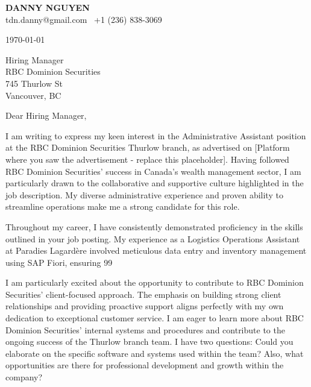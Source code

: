 \documentclass[letterpaper,11pt]{article}
\begin{document}
\textbf{DANNY NGUYEN} \\
tdn.danny@gmail.com \textbullet\ +1 (236) 838-3069 \\
\vspace{20pt}

\today \\
\vspace{20pt}

Hiring Manager \\
RBC Dominion Securities \\
745 Thurlow St \\
Vancouver, BC \\
\vspace{20pt}

Dear Hiring Manager, \\
\vspace{10pt}

I am writing to express my keen interest in the Administrative Assistant position at the RBC Dominion Securities Thurlow branch, as advertised on [Platform where you saw the advertisement -  replace this placeholder].  Having followed RBC Dominion Securities' success in Canada's wealth management sector, I am particularly drawn to the collaborative and supportive culture highlighted in the job description. My diverse administrative experience and proven ability to streamline operations make me a strong candidate for this role.


\vspace{10pt}

Throughout my career, I have consistently demonstrated proficiency in the skills outlined in your job posting.  My experience as a Logistics Operations Assistant at Paradies Lagardère involved meticulous data entry and inventory management using SAP Fiori, ensuring 99%


\vspace{10pt}

I am particularly excited about the opportunity to contribute to RBC Dominion Securities' client-focused approach.  The emphasis on building strong client relationships and providing proactive support aligns perfectly with my own dedication to exceptional customer service. I am eager to learn more about RBC Dominion Securities' internal systems and procedures and contribute to the ongoing success of the Thurlow branch team.  I have two questions:  Could you elaborate on the specific software and systems used within the team? Also, what opportunities are there for professional development and growth within the company?
\end{document}
